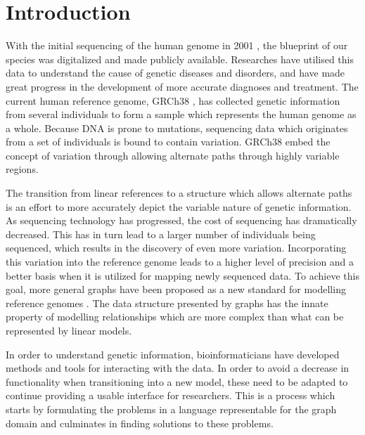 \documentclass[thesis.tex]{subfiles}
\begin{document}
\chapter{Introduction}
With the initial sequencing of the human genome in 2001 \cite{human_genome}, the blueprint of our species was digitalized and made publicly available. Researches have utilised this data to understand the cause of genetic diseases and disorders, and have made great progress in the development of more accurate diagnoses and treatment. The current human reference genome, GRCh38 \cite{grch38}, has collected genetic information from several individuals to form a sample which represents the human genome as a whole. Because DNA is prone to mutations, sequencing data which originates from a set of individuals is bound to contain variation. GRCh38 embed the concept of variation through allowing alternate paths through highly variable regions.\\
\par\noindent
The transition from linear references to a structure which allows alternate paths is an effort to more accurately depict the variable nature of genetic information. As sequencing technology has progressed, the cost of sequencing has dramatically decreased. This has in turn lead to a larger number of individuals being sequenced, which results in the discovery of even more variation. Incorporating this variation into the reference genome leads to a higher level of precision and a better basis when it is utilized for mapping newly sequenced data. To achieve this goal, more general graphs have been proposed as a new standard for modelling reference genomes \cite{extending_reference_assembly_models}. The data structure presented by graphs has the innate property of modelling relationships which are more complex than what can be represented by linear models.\\
\par\noindent
In order to understand genetic information, bioinformaticians have developed methods and tools for interacting with the data. In order to avoid a decrease in functionality when transitioning into a new model, these need to be adapted to continue providing a usable interface for researchers. This is a process which starts by formulating the problems in a language representable for the graph domain and culminates in finding solutions to these problems.
\end{document}
